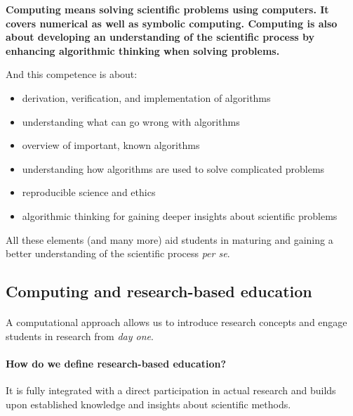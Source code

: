 \documentclass[%
twoside,                 %
final,                   %
10pt]{article}
\begin{document}
\textbf{Computing means solving scientific problems using computers. It covers numerical as well as symbolic computing. Computing is also about developing an understanding of the scientific process by enhancing algorithmic thinking when solving problems.}

And this  competence is about:

\begin{itemize}
\item derivation, verification, and implementation of algorithms

\item understanding what can go wrong with algorithms

\item overview of important, known algorithms

\item understanding how algorithms are used to solve complicated problems

\item reproducible science and ethics

\item algorithmic thinking for gaining deeper insights about scientific problems
\end{itemize}

\noindent
All these elements (and many more) aid students in maturing and gaining a better understanding of the scientific process \emph{per se}.







\subsection*{Computing and research-based education}

\paragraph{}
A computational approach allows us to introduce research concepts and engage students in research from \emph{day one}.



\paragraph{How do we define research-based education?}
It is fully integrated with a direct participation in actual research and builds upon established
knowledge and insights about scientific methods.
\end{document}
